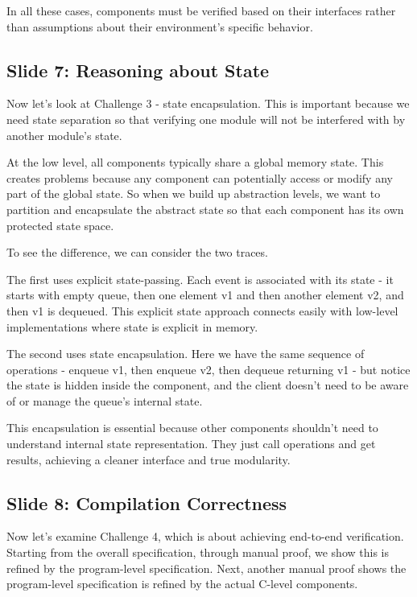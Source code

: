 \documentclass{article}
\begin{document}
In all these cases, components must be verified based on their interfaces rather
than assumptions about their environment's specific behavior.

\subsection{Slide 7: Reasoning about State}

Now let's look at Challenge 3 - state encapsulation. This is important because
we need state separation so that verifying one module will not be interfered
with by another module's state.

At the low level, all components typically share a global memory state. This
creates problems because any component can potentially access or modify any part
of the global state. So when we build up abstraction levels, we want to
partition and encapsulate the abstract state so that each component has its own
protected state space.

To see the difference, we can consider the two traces.

The first uses explicit state-passing. Each event is associated with
its state - it starts with empty queue, then one element v1 and then another
element v2, and then v1 is dequeued. This explicit state approach connects
easily with low-level implementations where state is explicit in memory.

The second uses state encapsulation. Here we have the same sequence of
operations - enqueue v1, then enqueue v2, then dequeue returning v1 - but notice
the state is hidden inside the component, and the client doesn't need to be
aware of or manage the queue's internal state.

This encapsulation is essential because other components shouldn't need to
understand internal state representation. They just call operations and get
results, achieving a cleaner interface and true modularity.

\subsection{Slide 8: Compilation Correctness}

Now let's examine Challenge 4, which is about achieving end-to-end verification.
Starting from the overall specification, through manual proof, we show this is
refined by the program-level specification. Next, another manual proof shows the
program-level specification is refined by the actual C-level components.
\end{document}
